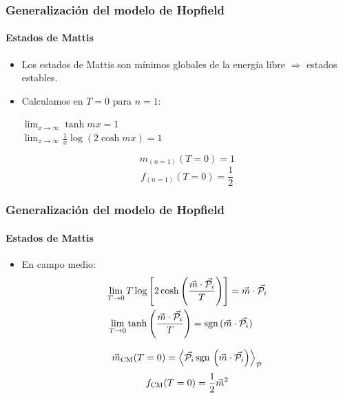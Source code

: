 \documentclass[11pt]{beamer}
\begin{document}
\begin{frame}
\frametitle{Generalización del modelo de Hopfield}
\framesubtitle{Estados de Mattis}
\begin{itemize}
	\item Los estados de Mattis son mínimos globales de la energía libre $\Rightarrow$ estados estables.
	\item Calculamos en $T=0$ para $n=1$:
	\begin{center}
	$\lim_{x\rightarrow\infty}\tanh mx=1$ \\
	$\lim_{x\rightarrow\infty}\frac{1}{x}\log\left(2\cosh mx\right)=1$
	\end{center}
	
	\begin{displaymath}
	m_{(n=1)}(T=0)=1
	\end{displaymath}
	\begin{displaymath}
	f_{(n=1)}(T=0)=\frac{1}{2}
	\end{displaymath}	
\end{itemize}
\end{frame}

\begin{frame}
\frametitle{Generalización del modelo de Hopfield}
\framesubtitle{Estados de Mattis}
\begin{itemize}
	\item En campo medio:
	\begin{align*}
	\lim_{T\rightarrow0}T\log&\left[2\cosh\left(\frac{\vec{m}\cdot\vec{\mathcal{P}_i}}{T}\right)\right]=\vec{m}\cdot\vec{\mathcal{P}_i} \\
	\lim_{T\rightarrow0}\tanh&\left(\frac{\vec{m}\cdot\vec{\mathcal{P}_i}}{T}\right)=\textnormal{sgn}\,(\vec{m}\cdot\vec{\mathcal{P}_i})
	\end{align*}
	
	\begin{displaymath}
	\vec{m}_{\textnormal{CM}}(T=0)=\left<\vec{\mathcal{P}_i}\,\textnormal{sgn}\,\left(\vec{m}\cdot\vec{\mathcal{P}_i}\right)\right>_{\mathcal{P}}
	\end{displaymath}
	\begin{displaymath}
	f_{\textnormal{CM}}(T=0)=\frac{1}{2}\vec{m}^2
	\end{displaymath}
\end{itemize}
\end{frame}
\end{document}
